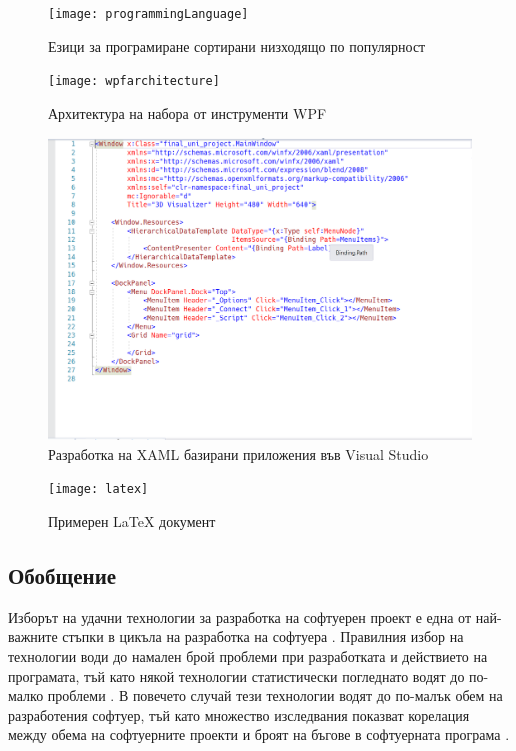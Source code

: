 \begin{figure}
    \centering
    \centerline{\texttt{[image: programmingLanguage]}}
    \caption{Езици за програмиране сортирани низходящо по популярност}
    \label{fig:prog}
\end{figure}


\begin{figure}
    \centering
    \centerline{\texttt{[image: wpfarchitecture]}}
    \caption{Архитектура на набора от инструменти WPF}
    \label{fig:wpf}
\end{figure}

\begin{figure}
    \centering
    \centerline{\includegraphics{xaml}}
    \caption{Разработка на XAML базирани приложения във Visual Studio}
    \label{vsXaml}
\end{figure}

\begin{figure}
    \centering
    \centerline{\texttt{[image: latex]}}
    \caption{Примерен LaTeX документ}
    \label{latexDoc}
\end{figure}

\subsection{Обобщение}
Изборът на удачни технологии за разработка на софтуерен проект е една от най-важните стъпки в цикъла на разработка на софтуера \cite{technologiesImportance}. Правилния избор на технологии води до намален брой проблеми при разработката и действието на програмата, тъй като някой технологии статистически погледнато водят до по-малко проблеми \cite{langResearch}. В повечето случай тези технологии водят до по-малък обем на разработения софтуер, тъй като множество изследвания показват корелация между обема на софтуерните проекти и броят на бъгове в софтуерната програма \cite{bugsToLength}.